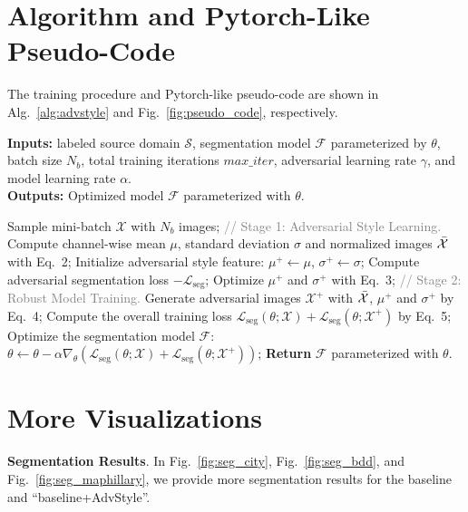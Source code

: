 \documentclass{article}
\newcommand{\ours}{AdvStyle\xspace}
\begin{document}
\section{Algorithm and Pytorch-Like Pseudo-Code}
\label{sec:alg-pytorch}


The training procedure and Pytorch-like pseudo-code are shown in Alg.~\ref{alg:advstyle} and Fig.~\ref{fig:pseudo_code}, respectively.


\begin{algorithm}[!ht]
    \caption{The training procedure of AdvStyle.}
    \label{alg:advstyle}
    \textbf{Inputs:} labeled source domain $\mathcal{S}$, segmentation model $\mathcal{F}$ parameterized by $\theta$, batch size $N_b$, total training iterations $max\_iter$, adversarial learning rate $\gamma$, and model learning rate $\alpha$. \\
    \textbf{Outputs:} Optimized model $\mathcal{F}$ parameterized with $\theta$.\\
\begin{algorithmic}[1]
            \STATE Sample mini-batch $\mathcal{X}$ with $N_b$ images;
            \STATE  \textcolor{gray}{// Stage 1: Adversarial Style Learning.}
            \STATE Compute channel-wise mean $\mu$, standard deviation $\sigma$ and normalized images $\Bar{\mathcal{X}}$ with Eq.~2;
            \STATE Initialize adversarial style feature: $\mu^+ \leftarrow \mu$, $\sigma^+ \leftarrow \sigma$;
                \STATE Compute adversarial segmentation loss $- \mathcal{L}_{\text{seg}}$;
                \STATE Optimize $\mu^+$ and $\sigma^+$ with Eq.~3; 
            \STATE  \textcolor{gray}{// Stage 2: Robust Model Training.}
            \STATE Generate adversarial images $\mathcal{X}^{+}$ with $\Bar{\mathcal{X}}$, $\mu^+$ and $\sigma^+$ by Eq.~4;
            \STATE Compute the overall training loss $\mathcal{L}_{\text{seg}}(\theta; \mathcal{X})+\mathcal{L}_{\text{seg}}(\theta; \mathcal{X}^+)$ by Eq.~5;
            \STATE Optimize the segmentation model $\mathcal{F}$: $\theta \leftarrow \theta - \alpha \nabla_{\theta} \left( \mathcal{L}_{\text{seg}}(\theta; \mathcal{X})+\mathcal{L}_{\text{seg}}(\theta; \mathcal{X}^+) \right)$;
        \ENDFOR
        \STATE \textbf{Return} $\mathcal{F}$ parameterized with $\theta$.
    \end{algorithmic}
\end{algorithm}


\section{More Visualizations}
\label{sec:seg_results}
\textbf{Segmentation Results}. In Fig.~\ref{fig:seg_city}, Fig.~\ref{fig:seg_bdd}, and Fig.~\ref{fig:seg_maphillary}, we provide more segmentation results for the baseline and ``baseline+\ours''.
\end{document}
